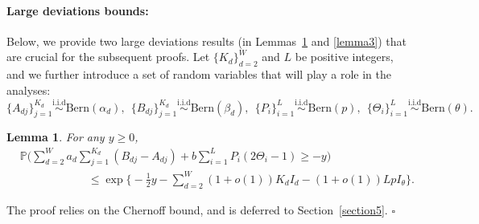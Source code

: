 \documentclass{article}
\newtheorem{lemma}{Lemma}
\newenvironment{proof}{{\noindent\it Proof:}\quad}{\hfill $\square$\par}
\begin{document}
\paragraph{Large deviations bounds:} Below, we provide two large deviations results (in Lemmas~\ref{lemma2} and \ref{lemma3}) that are crucial for the subsequent proofs.  Let $\{K_d\}_{d=2}^W$ and $L$ be positive integers, and we further introduce a set of random variables that will play a role in the analyses: 
$$\{A_{dj} \}_{j=1}^{K_d} \overset{\text{i.i.d}}{\sim} \text{Bern}(\alpha_d), \ \ \{B_{dj}\}_{j =1}^{K_d} \overset{\text{i.i.d}}{\sim} \text{Bern}(\beta_d), \ \ \{P_{i}\}_{i=1}^L \overset{\text{i.i.d}}{\sim} \text{Bern}(p) ,\ \  \{\Theta_i\}_{i=1}^L \overset{\text{i.i.d}}{\sim} \text{Bern}(\theta).$$


\begin{lemma}\label{lemma2}
For any $y \geq 0$,
\begin{equation}
\begin{aligned}
    &\mathbb{P} \Big( \sum_{d=2}^{W} a_d  \sum_{j=1}^{K_d} (B_{dj} - A_{dj}) + b \sum_{i=1}^{L}P_i(2\Theta_i - 1) \geq -y  \Big) \\
    &\qquad\qquad\qquad\leq \exp \Big\{-\frac{1}{2}y - \sum_{d=2}^{W}(1+o(1))K_d I_d - (1+o(1)) L p I_\theta \Big\}. 
    \end{aligned}
    \end{equation}
\end{lemma}
\begin{proof}
    The proof relies on the Chernoff bound, and is deferred to Section~\ref{section5}.
\end{proof}
\end{document}
